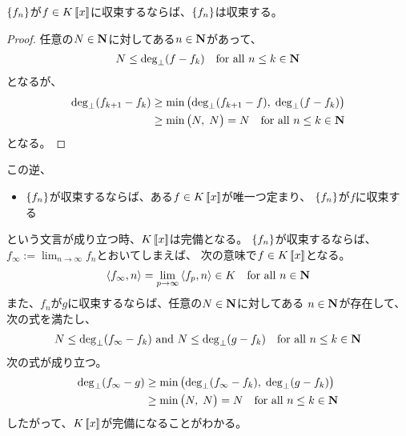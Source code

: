 {	$\mathinner{\left\{{f_n}\right\}}$が$f\in K\mathinner{[\![{x}]\!]}$に収束するならば、$\mathinner{\left\{{f_n}\right\}}$は収束する。
	\begin{proof} %
		任意の$N\in\mathbf{N}$に対してある$n\in\mathbf{N}$があって、
		\begin{equation*}\begin{split}
			N\le\deg_\bot(f - f_k) \quad\text{for all }n\le k\in\mathbf{N}
		\end{split}\end{equation*}
		となるが、
		\begin{equation*}\begin{split}
			\deg_\bot(f_{k+1} - f_k)
			&\ge\min\mathinner{\bigl({\deg_\bot(f_{k+1} - f),\;\deg_\bot(f - f_k)}\bigr)} \\
			&\ge\min\mathinner{\bigl({N,\;N}\bigr)} = N \quad\text{for all }n\le k\in\mathbf{N}
		\end{split}\end{equation*}
		となる。
	\end{proof} %
	この逆、
	\begin{itemize}\setlength{\itemsep}{-1mm} %
		\item $\mathinner{\left\{{f_n}\right\}}$が収束するならば、ある$f\in K\mathinner{[\![{x}]\!]}$が唯一つ定まり、
		$\mathinner{\left\{{f_n}\right\}}$が$f$に収束する
	\end{itemize} %
	という文言が成り立つ時、$K\mathinner{[\![{x}]\!]}$は完備となる。
	$\mathinner{\left\{{f_n}\right\}}$が収束するならば、$f_\infty:=\lim_{n\to\infty}f_n$とおいてしまえば、
	次の意味で$f\in K\mathinner{[\![{x}]\!]}$となる。
	\begin{equation*}\begin{split}
		\mathinner{\langle{f_\infty,n}\rangle} = \lim_{p\to\infty} \mathinner{\langle{f_p,n}\rangle}\in K
		\quad\text{for all } n\in\mathbf{N}
	\end{split}\end{equation*}
	また、${f_n}$が$g$に収束するならば、任意の$N\in\mathbf{N}$に対してある
	$n\in\mathbf{N}$が存在して、次の式を満たし、
	\begin{equation*}\begin{split}
		N\le\deg_\bot(f_\infty - f_k) \text{ and } N\le\deg_\bot(g - f_k)
		\quad\text{for all }n\le k\in\mathbf{N}
	\end{split}\end{equation*}
	次の式が成り立つ。
	\begin{equation*}\begin{split}
		\deg_\bot(f_\infty - g)
		&\ge\min\mathinner{\bigl({\deg_\bot(f_\infty - f_k),\;\deg_\bot(g - f_k)}\bigr)} \\
		&\ge\min\mathinner{\bigl({N,\;N}\bigr)} = N \quad\text{for all }n\le k\in\mathbf{N}
	\end{split}\end{equation*}
	したがって、$K\mathinner{[\![{x}]\!]}$が完備になることがわかる。

}
